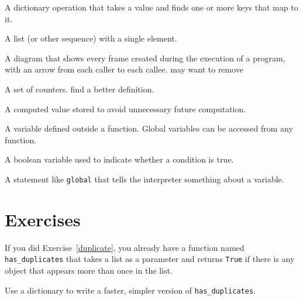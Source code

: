 \begin{vocabulary} A dictionary operation that takes a value and finds
one or more keys that map to it.
\end{vocabulary}
	
\begin{vocabulary}[singleton:] A list (or other sequence) with a single element.
\end{vocabulary}
	
\begin{vocabulary} A diagram that shows every frame created during
the execution of a program, with an arrow from each caller to
each callee. {\color{red}may want to remove}
\end{vocabulary}
	
\begin{vocabulary}[histogram:] A set of counters. {\color{red}find a better definition.}
\end{vocabulary}
	
\begin{vocabulary}[memo:] A computed value stored to avoid unnecessary future 
computation.
\end{vocabulary}
	
\begin{vocabulary}  A variable defined outside a function.  Global
variables can be accessed from any function.
\end{vocabulary}
	
\begin{vocabulary}[flag:] A boolean variable used to indicate whether a condition
is true.
\end{vocabulary}
	
\begin{vocabulary}[declaration:] A statement like {\tt global} that tells the
interpreter something about a variable.
\end{vocabulary}
	

\section{Exercises}

\begin{exercise}

If you did {\color{red} Exercise~\ref{duplicate}}, you already have
a function named \verb"has_duplicates" that takes a list
as a parameter and returns {\tt True} if there is any object
that appears more than once in the list.

Use a dictionary to write a faster, simpler version of
\verb"has_duplicates".
\end{exercise}


